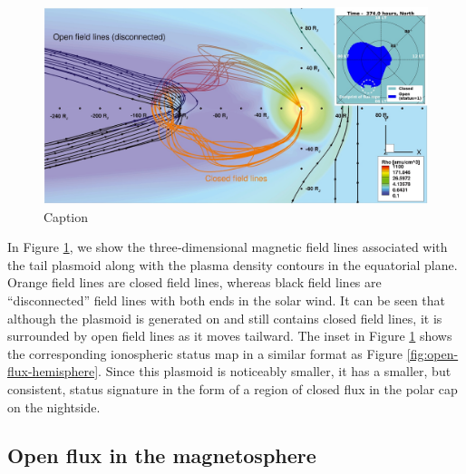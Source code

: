 \begin{figure}
    \centering
    \includegraphics[width=\textwidth]{images4/plasmoid-3d-inset.jpg}
    \caption{Caption}
    \label{fig:plasmoid-3d-inset}
\end{figure}

In Figure \ref{fig:plasmoid-3d-inset}, we show the three‐dimensional magnetic field lines associated with the tail plasmoid along with the plasma density contours in the equatorial plane. Orange field lines are closed field lines, whereas black field lines are “disconnected” field lines with both ends in the solar wind. It can be seen that although the plasmoid is generated on and still contains closed field lines, it is surrounded by open field lines as it moves tailward. The inset in Figure \ref{fig:plasmoid-3d-inset} shows the corresponding ionospheric status map in a similar format as Figure \ref{fig:open-flux-hemisphere}. Since this plasmoid is noticeably smaller, it has a smaller, but consistent, status signature in the form of a region of closed flux in the polar cap on the nightside. 

\subsection{Open flux in the magnetosphere}

